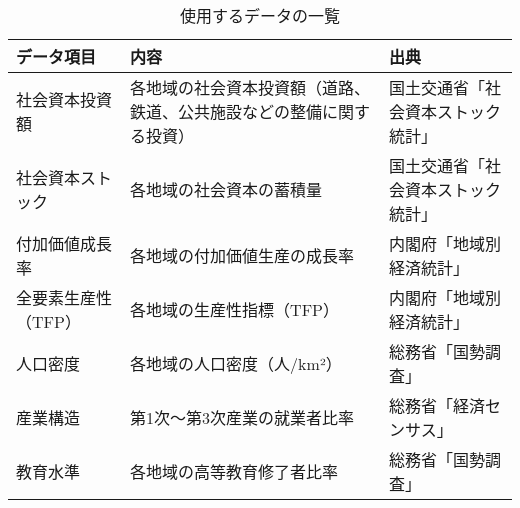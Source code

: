 \begin{table}[h!]
  \centering
  \renewcommand{\arraystretch}{1.2} %
  \begin{tabularx}{\textwidth}{p{} X p{}}
  \toprule
  \textbf{データ項目}         & \textbf{内容}                                              & \textbf{出典}                         \\
  \midrule
  社会資本投資額             & 各地域の社会資本投資額（道路、鉄道、公共施設などの整備に関する投資） & 国土交通省「社会資本ストック統計」    \\
  社会資本ストック           & 各地域の社会資本の蓄積量                                    & 国土交通省「社会資本ストック統計」    \\
  付加価値成長率             & 各地域の付加価値生産の成長率                                & 内閣府「地域別経済統計」              \\
  全要素生産性（TFP）        & 各地域の生産性指標（TFP）                                  & 内閣府「地域別経済統計」              \\
  人口密度                   & 各地域の人口密度（人/km²）                                 & 総務省「国勢調査」                    \\
  産業構造                   & 第1次～第3次産業の就業者比率                                & 総務省「経済センサス」                \\
  教育水準                   & 各地域の高等教育修了者比率                                  & 総務省「国勢調査」                    \\
  \bottomrule
  \end{tabularx}
  \caption{使用するデータの一覧}
  \label{tab:data}
  \end{table}
  

